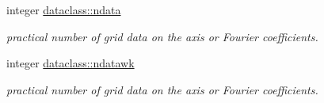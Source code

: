 \textbf{ }\par
\begin{DoxyCompactItemize}
\item 
integer \mbox{\hyperlink{namespacedataclass_a72f075bdeedd35dc0962289e6f3461ba}{dataclass\+::ndata}}
\begin{DoxyCompactList}\small\item\em practical number of grid data on the axis or Fourier coefficients. \end{DoxyCompactList}\item 
integer \mbox{\hyperlink{namespacedataclass_ae1faef34fdc08790ab0a4d85650d797f}{dataclass\+::ndatawk}}
\begin{DoxyCompactList}\small\item\em practical number of grid data on the axis or Fourier coefficients. \end{DoxyCompactList}\end{DoxyCompactItemize}

